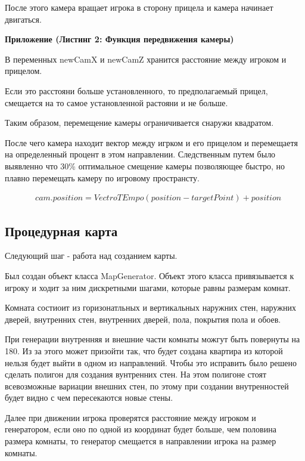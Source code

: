 \documentclass[14pt, titlepage,fleqn,a4paper]{extarticle}
\begin{document}
    После этого камера вращает игрока в сторону прицела и камера начинает двигаться.
    
    \textbf{Приложение (Листинг 2: Функция передвижения камеры)}
    
    В переменных newCamX и newCamZ хранится расстояние между игроком и прицелом. 
    
    Если это расстояни больше установленного, то предполагаемый прицел, смещается на то самое установленной растояни и не больше.
    
    Таким образом, перемещение камеры ограничивается снаружи квадратом.
    
    После чего камера находит вектор между игрком и его прицелом и перемещаетя на определенный процент в этом направлении. Следственным путем было выявленно что 30\% оптимальное смещение камеры позволяющее быстро, но плавно перемещать камеру по игровому пространсту.
    
    \begin{align*}
        & cam.position = VectroTEmpo(position - targetPoint) + position
    \end{align*}
    
    \subsection*{Процедурная карта}
	
	Следующий шаг - работа над созданием карты.
	
	Был создан объект класса MapGenerator. Объект этого класса привязывается к игроку и ходит за ним дискретными шагами, которые равны размерам комнат. 
	
	Комната состиоит из горизонатльных и вертикальных наружних стен, наружних дверей, внутренних стен, внутренних дверей, пола, покрытия пола и обоев.
	
	При генерации внутренняя и внешние части комнаты можгут быть повернуты на 180\textdegree. Из за этого может призойти так, что будет создана квартира из которой нельзя будет выйти в одном из направлений. Чтобы это исправить было решено сделать полигон для создания вунтренних стен. На этом полигоне стоят всевозможные вариации внешних стен, по этому при создании внутренностей будет видно с чем пересекаются новые стены.
	
	Далее при движении игрока проверятся расстояние между игроком и генератором, если оно по одной из координат будет больше, чем половина размера комнаты, то генератор смещается в направлении игрока на размер комнаты. 
	
\end{document}
